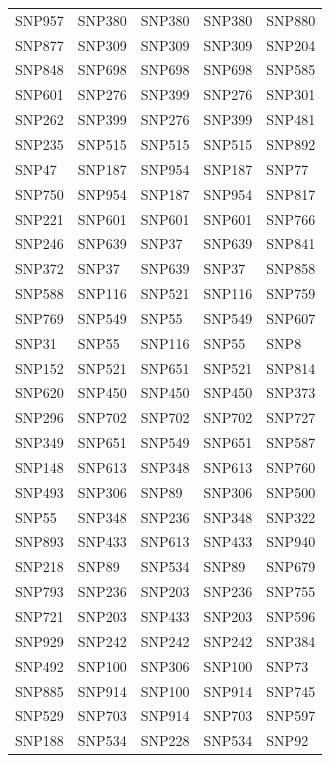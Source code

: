 \begin{table}[ht]
\begin{tabular}{lllll}
  SNP957 & SNP380 & SNP380 & SNP380 & SNP880 \\ 
  SNP877 & SNP309 & SNP309 & SNP309 & SNP204 \\ 
  SNP848 & SNP698 & SNP698 & SNP698 & SNP585 \\ 
  SNP601 & SNP276 & SNP399 & SNP276 & SNP301 \\ 
  SNP262 & SNP399 & SNP276 & SNP399 & SNP481 \\ 
  SNP235 & SNP515 & SNP515 & SNP515 & SNP892 \\ 
  SNP47 & SNP187 & SNP954 & SNP187 & SNP77 \\ 
  SNP750 & SNP954 & SNP187 & SNP954 & SNP817 \\ 
  SNP221 & SNP601 & SNP601 & SNP601 & SNP766 \\ 
  SNP246 & SNP639 & SNP37 & SNP639 & SNP841 \\ 
  SNP372 & SNP37 & SNP639 & SNP37 & SNP858 \\ 
  SNP588 & SNP116 & SNP521 & SNP116 & SNP759 \\ 
  SNP769 & SNP549 & SNP55 & SNP549 & SNP607 \\ 
  SNP31 & SNP55 & SNP116 & SNP55 & SNP8 \\ 
  SNP152 & SNP521 & SNP651 & SNP521 & SNP814 \\ 
  SNP620 & SNP450 & SNP450 & SNP450 & SNP373 \\ 
  SNP296 & SNP702 & SNP702 & SNP702 & SNP727 \\ 
  SNP349 & SNP651 & SNP549 & SNP651 & SNP587 \\ 
  SNP148 & SNP613 & SNP348 & SNP613 & SNP760 \\ 
  SNP493 & SNP306 & SNP89 & SNP306 & SNP500 \\ 
  SNP55 & SNP348 & SNP236 & SNP348 & SNP322 \\ 
  SNP893 & SNP433 & SNP613 & SNP433 & SNP940 \\ 
  SNP218 & SNP89 & SNP534 & SNP89 & SNP679 \\ 
  SNP793 & SNP236 & SNP203 & SNP236 & SNP755 \\ 
  SNP721 & SNP203 & SNP433 & SNP203 & SNP596 \\ 
  SNP929 & SNP242 & SNP242 & SNP242 & SNP384 \\ 
  SNP492 & SNP100 & SNP306 & SNP100 & SNP73 \\ 
  SNP885 & SNP914 & SNP100 & SNP914 & SNP745 \\ 
  SNP529 & SNP703 & SNP914 & SNP703 & SNP597 \\ 
  SNP188 & SNP534 & SNP228 & SNP534 & SNP92 \\ 

\end{tabular}
\end{table}
